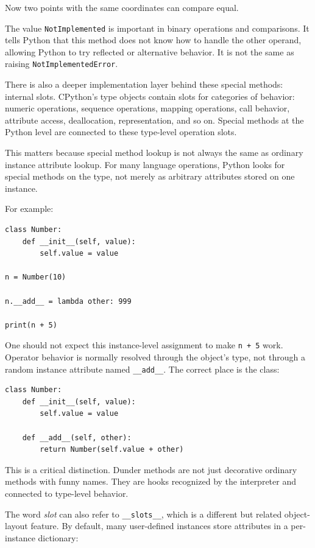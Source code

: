 Now two points with the same coordinates can compare equal.

The value \texttt{NotImplemented} is important in binary operations and comparisons. It tells Python that this method does not know how to handle the other operand, allowing Python to try reflected or alternative behavior. It is not the same as raising \texttt{NotImplementedError}.

There is also a deeper implementation layer behind these special methods: internal slots. CPython's type objects contain slots for categories of behavior: numeric operations, sequence operations, mapping operations, call behavior, attribute access, deallocation, representation, and so on. Special methods at the Python level are connected to these type-level operation slots.

This matters because special method lookup is not always the same as ordinary instance attribute lookup. For many language operations, Python looks for special methods on the type, not merely as arbitrary attributes stored on one instance.

For example:

\begin{verbatim}
class Number:
    def __init__(self, value):
        self.value = value

n = Number(10)

n.__add__ = lambda other: 999

print(n + 5)
\end{verbatim}

One should not expect this instance-level assignment to make \texttt{n + 5} work. Operator behavior is normally resolved through the object's type, not through a random instance attribute named \texttt{\_\_add\_\_}. The correct place is the class:

\begin{verbatim}
class Number:
    def __init__(self, value):
        self.value = value

    def __add__(self, other):
        return Number(self.value + other)
\end{verbatim}

This is a critical distinction. Dunder methods are not just decorative ordinary methods with funny names. They are hooks recognized by the interpreter and connected to type-level behavior.

The word \emph{slot} can also refer to \texttt{\_\_slots\_\_}, which is a different but related object-layout feature. By default, many user-defined instances store attributes in a per-instance dictionary:

